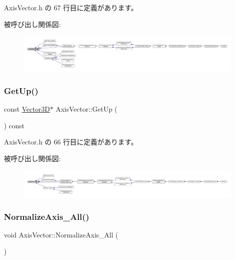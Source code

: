  Axis\+Vector.\+h の 67 行目に定義があります。

被呼び出し関係図\+:
\nopagebreak
\begin{figure}[H]
\begin{center}
\leavevmode
\includegraphics[width=350pt]{class_axis_vector_a1d4f944d118d6f999c516dbdc0827a39_icgraph}
\end{center}
\end{figure}
\mbox{\label{class_axis_vector_aba45ae6f91ac516e6e42fdb8bcfcae2e}} 
\subsubsection{\texorpdfstring{Get\+Up()}{GetUp()}}
{\footnotesize\ttfamily const \mbox{\hyperlink{class_vector3_d}{Vector3D}}$\ast$ Axis\+Vector\+::\+Get\+Up (\begin{DoxyParamCaption}{ }\end{DoxyParamCaption}) const\hspace{0.3cm}{\ttfamily [inline]}}



 Axis\+Vector.\+h の 66 行目に定義があります。

被呼び出し関係図\+:
\nopagebreak
\begin{figure}[H]
\begin{center}
\leavevmode
\includegraphics[width=350pt]{class_axis_vector_aba45ae6f91ac516e6e42fdb8bcfcae2e_icgraph}
\end{center}
\end{figure}
\mbox{\label{class_axis_vector_abd3b0ec608bc18dc9996cf9fa1d121b0}} 
\subsubsection{\texorpdfstring{Normalize\+Axis\+\_\+\+All()}{NormalizeAxis\_All()}}
{\footnotesize\ttfamily void Axis\+Vector\+::\+Normalize\+Axis\+\_\+\+All (\begin{DoxyParamCaption}{ }\end{DoxyParamCaption})\hspace{0.3cm}{\ttfamily [private]}}



